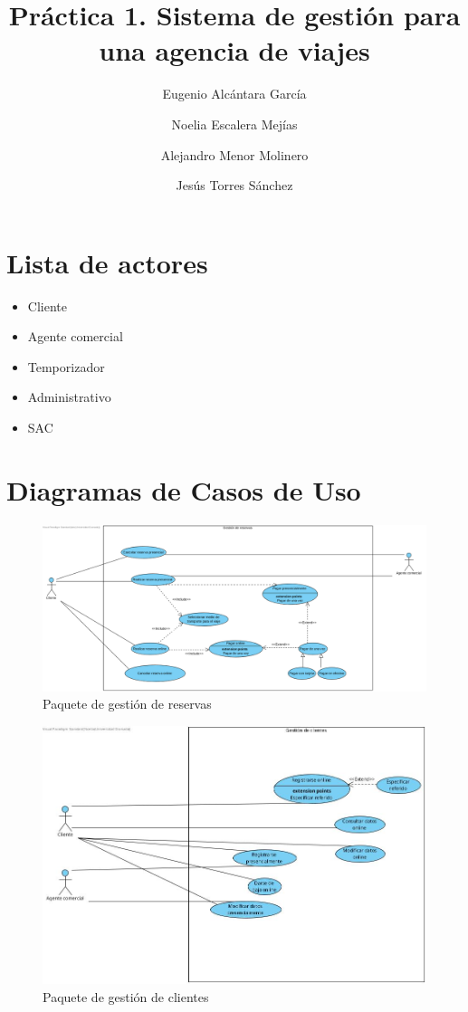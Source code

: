 \documentclass{article}
\title{Práctica 1. Sistema de gestión para una agencia de viajes}
\author{Eugenio Alcántara García\\
		\and Noelia Escalera Mejías\\
		\and Alejandro Menor Molinero\\
		\and Jesús Torres Sánchez}
\begin{document}
	\maketitle
	\section{Lista de actores}
	\begin{itemize}
		\item Cliente
		\item Agente comercial
		\item Temporizador
		\item Administrativo
		\item SAC
	\end{itemize}

	\section{Diagramas de Casos de Uso}
	
	\begin{figure}[H]
		\centering
		\includegraphics[totalheight=7cm]{Gestion_reservas}
		\caption{Paquete de gestión de reservas}
		\label{fig:gestion_reservas}
	\end{figure}

	\begin{figure}[H]
		\centering
		\includegraphics[totalheight=7cm]{Gestion_clientes}
		\caption{Paquete de gestión de clientes}
		\label{fig:gestion_clientes}
	\end{figure}
\end{document}
